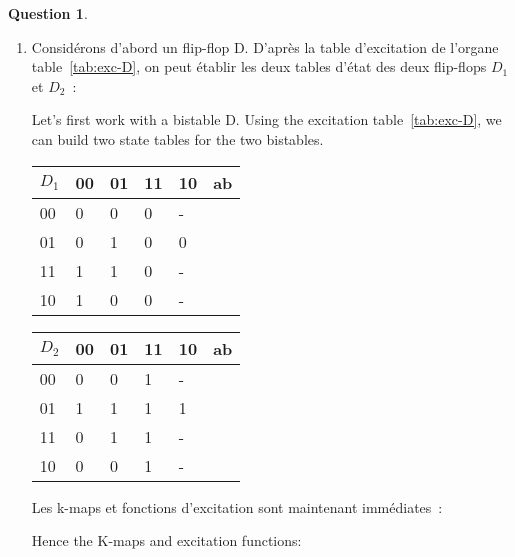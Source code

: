 \documentclass[11pt,a4paper,dvipsnames]{article}
\theoremstyle{definition}%
\newtheorem{Q}{Question}[] %
\newcommand{\fr}[1]{
 	\ifthenelse {\boolean{fr}} {#1} {}
 }
\newcommand{\en}[1]{
 	\ifthenelse {\boolean{en}} {#1} {}
 }
\begin{document}
\begin{Q}
{		\begin{enumerate}
			\item \fr{Considérons d'abord un flip-flop D.
			D'après la table d'excitation de l'organe table~\ref{tab:exc-D}, on peut établir les deux tables d'état des deux flip-flops $D_1$ et $D_2$~:}
			\en{Let's first work with a bistable D.
			Using the excitation table~\ref{tab:exc-D}, we can build two state tables for the two bistables.}
			\begin{center}
				\begin{tabular}{|l|l|l|l|l|l} \hline
				$D_1$ & 00         & 01         & 11         & 10         & \multicolumn{1}{l|}{ab} \\ \hline
				00           & 0 & 0 & 0 & - & \\ \cline{1-5}
				01           & 0 & 1 & 0 & 0 & \\ \cline{1-5}
				11           & 1 & 1 & 0 & - & \\ \cline{1-5}
				10           & 1 & 0 & 0 & - & \\ \cline{1-5}
				\end{tabular}
				\begin{tabular}{|l|l|l|l|l|l} \hline
				$D_2$ & 00         & 01         & 11         & 10         & \multicolumn{1}{l|}{ab} \\ \hline
				00           & 0 & 0 & 1 & - & \\ \cline{1-5}
				01           & 1 & 1 & 1 & 1 & \\ \cline{1-5}
				11           & 0 & 1 & 1 & - & \\ \cline{1-5}
				10           & 0 & 0 & 1 & - & \\ \cline{1-5}
				\end{tabular}
			\end{center}

			\fr{Les k-maps et fonctions d'excitation sont maintenant immédiates~:}
			\en{Hence the K-maps and excitation functions:}
			\begin{center}

			\end{center}



\end{enumerate}}
\end{Q}
\end{document}
